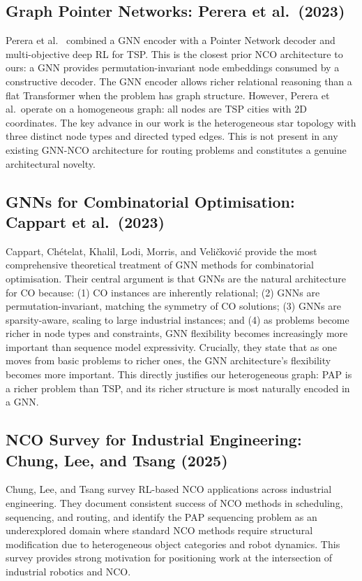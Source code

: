 \documentclass[conference]{IEEEtran}
\begin{document}
\subsection{Graph Pointer Networks: Perera et al.\ (2023)}

Perera et al.\ \cite{perera2023gpn} combined a GNN encoder with a Pointer Network decoder and multi-objective deep RL for TSP. This is the closest prior NCO architecture to ours: a GNN provides permutation-invariant node embeddings consumed by a constructive decoder. The GNN encoder allows richer relational reasoning than a flat Transformer when the problem has graph structure. However, Perera et al.\ operate on a homogeneous graph: all nodes are TSP cities with 2D coordinates. The key advance in our work is the heterogeneous star topology with three distinct node types and directed typed edges. This is not present in any existing GNN-NCO architecture for routing problems and constitutes a genuine architectural novelty.

\subsection{GNNs for Combinatorial Optimisation: Cappart et al.\ (2023)}

Cappart, Ch\'{e}telat, Khalil, Lodi, Morris, and Veli\v{c}kovi\'{c} \cite{cappart2023gnnco} provide the most comprehensive theoretical treatment of GNN methods for combinatorial optimisation. Their central argument is that GNNs are the natural architecture for CO because: (1) CO instances are inherently relational; (2) GNNs are permutation-invariant, matching the symmetry of CO solutions; (3) GNNs are sparsity-aware, scaling to large industrial instances; and (4) as problems become richer in node types and constraints, GNN flexibility becomes increasingly more important than sequence model expressivity. Crucially, they state that as one moves from basic problems to richer ones, the GNN architecture's flexibility becomes more important. This directly justifies our heterogeneous graph: PAP is a richer problem than TSP, and its richer structure is most naturally encoded in a GNN.

\subsection{NCO Survey for Industrial Engineering: Chung, Lee, and Tsang (2025)}

Chung, Lee, and Tsang \cite{chung2025ncosurvey} survey RL-based NCO applications across industrial engineering. They document consistent success of NCO methods in scheduling, sequencing, and routing, and identify the PAP sequencing problem as an underexplored domain where standard NCO methods require structural modification due to heterogeneous object categories and robot dynamics. This survey provides strong motivation for positioning work at the intersection of industrial robotics and NCO.
\end{document}
